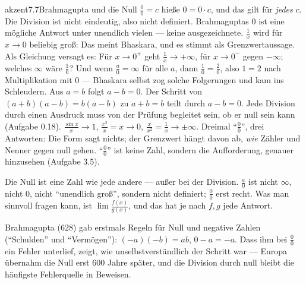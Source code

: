 \begin{loesungkarte}{akzent}{7.7}{Brahmagupta und die Null}
$\frac00 = c$ hieße $0 = 0\cdot c$, und das gilt für \emph{jedes} $c$. Die Division ist nicht eindeutig, also nicht definiert. Brahmaguptas $0$ ist eine mögliche Antwort unter unendlich vielen --- keine ausgezeichnete.
$\frac1x$ wird für $x\to0$ beliebig groß: Das meint Bhaskara, und es stimmt als Grenzwertaussage. Als Gleichung versagt es: Für $x\to0^{+}$ geht $\frac1x\to+\infty$, für $x\to0^{-}$ gegen $-\infty$; welches $\infty$ wäre $\frac10$? Und wenn $\frac a0 = \infty$ für alle $a$, dann $\frac10 = \frac20$, also $1 = 2$ nach Multiplikation mit $0$ --- Bhaskara selbst zog solche Folgerungen und kam ins Schleudern.
Aus $a = b$ folgt $a - b = 0$. Der Schritt von $(a + b)(a - b) = b(a - b)$ zu $a + b = b$ teilt durch $a - b = 0$. Jede Division durch einen Ausdruck muss von der Prüfung begleitet sein, ob er null sein kann (Aufgabe 0.18).
$\frac{\sin x}x\to1$, $\frac{x^{2}}x = x\to0$, $\frac x{x^{2}} = \frac1x\to\pm\infty$. Dreimal \enquote{$\frac00$}, drei Antworten: Die Form sagt nichts; der Grenzwert hängt davon ab, \emph{wie} Zähler und Nenner gegen null gehen. \enquote{$\frac00$} ist keine Zahl, sondern die Aufforderung, genauer hinzusehen (Aufgabe 3.5).
\begin{fehler}\kastentext
Die Null ist eine Zahl wie jede andere --- außer bei der Division. $\frac a0$ ist nicht $\infty$, nicht $0$, nicht \enquote{unendlich groß}, sondern nicht definiert; $\frac00$ erst recht. Was man sinnvoll fragen kann, ist $\lim\frac{f(x)}{g(x)}$, und das hat je nach $f, g$ jede Antwort.
\end{fehler}
\begin{mitnehmen}\kastentext
Brahmagupta ($628$) gab erstmals Regeln für Null und negative Zahlen (\enquote{Schulden} und \enquote{Vermögen}): $(-a)(-b) = ab$, $0 - a = -a$. Dass ihm bei $\frac00$ ein Fehler unterlief, zeigt, wie unselbstverständlich der Schritt war --- Europa übernahm die Null erst $600$ Jahre später, und die Division durch null bleibt die häufigste Fehlerquelle in Beweisen.
\end{mitnehmen}
\end{loesungkarte}


